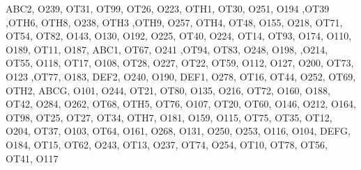 ABC2,
O239,
OT31,
OT99,
OT26,
O223,
OTH1,
OT30,
O251,
O194
,OT39
,OTH6,
OTH8,
O238,
OTH3
,OTH9,
O257,
OTH4,
OT48,
O155,
O218,
OT71,
OT54,
OT82,
O143,
O130,
O192,
O225,
OT40,
O224,
OT14,
OT93,
O174,
O110,
O189,
OT11,
O187,
ABC1,
OT67,
O241
,OT94,
OT83,
O248,
O198,
,O214,
OT55,
O118,
OT17,
O108,
OT28,
O227,
OT22,
OT59,
O112,
O127,
O200,
OT73,
O123
,OT77,
O183,
DEF2,
O240,
O190,
DEF1,
O278,
OT16,
OT44,
O252,
OT69,
OTH2,
ABCG,
O101,
O244,
OT21,
OT80,
O135,
O216,
OT72,
O160,
O188,
OT42,
O284,
O262,
OT68,
OTH5,
OT76,
O107,
OT20,
OT60,
O146,
O212,
O164,
OT98,
OT25,
OT27,
OT34,
OTH7,
O181,
O159,
O115,
OT75,
OT35,
OT12,
O204,
OT37,
O103,
OT64,
O161,
O268,
O131,
O250,
O253,
O116,
O104,
DEFG,
O184,
OT15,
OT62,
O243,
OT13,
O237,
OT74,
O254,
OT10,
OT78,
OT56,
OT41,
O117
